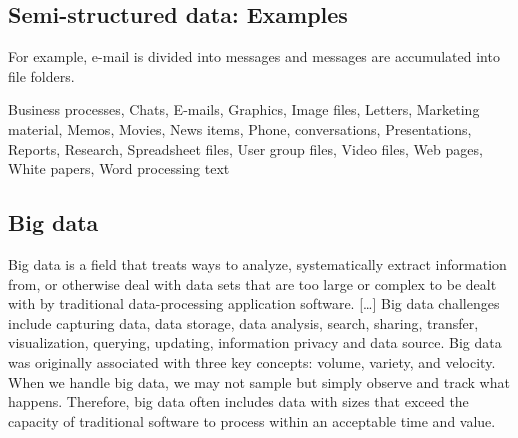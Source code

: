 




%


\subsection{Semi-structured data: Examples}
For example, e-mail is divided into messages and messages are accumulated into file folders. 

Business processes, Chats, E-mails, Graphics, Image files, Letters, Marketing material, Memos, Movies, News items, Phone, conversations, Presentations, Reports, Research, Spreadsheet files, 
User group files, Video files, Web pages, White papers, Word processing text

\pbn
{}




\pbn
\subsection{Big data}
Big data is a field that treats ways to analyze, systematically extract information from, or otherwise deal with data sets that are too large or complex to be dealt with by traditional data-processing application software. [\dots]
Big data challenges include capturing data, data storage, data analysis, search, sharing, transfer, visualization, querying, updating, information privacy and data source. Big data was originally associated with three key concepts: volume, variety, and velocity. When we handle big data, we may not sample but simply observe and track what happens. Therefore, big data often includes data with sizes that exceed the capacity of traditional software to process within an acceptable time and value. 

